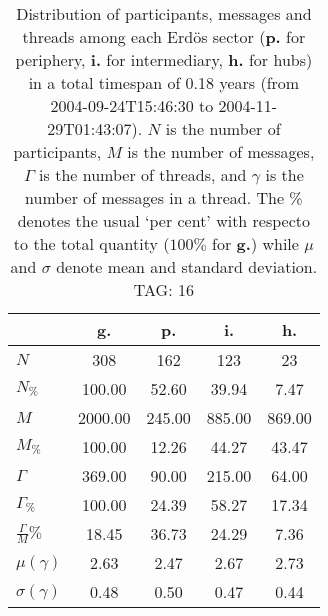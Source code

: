 \begin{table}[h!]
\begin{center}
\begin{tabular}{| l || c | c | c | c |}\hline
 & {\bf g.} & {\bf p.} & {\bf i.} & {\bf h.} \\\hline\hline
$N$ & 308  & 162  & 123  & 23 \\
$N_{\%}$ & 100.00  & 52.60  & 39.94  & 7.47 \\\hline
$M$ & 2000.00  & 245.00  & 885.00  & 869.00 \\
$M_{\%}$ & 100.00  & 12.26  & 44.27  & 43.47 \\\hline
$\Gamma$ & 369.00  & 90.00  & 215.00  & 64.00 \\
$\Gamma_{\%}$ & 100.00  & 24.39  & 58.27  & 17.34 \\\hline
$\frac{\Gamma}{M}\%$ & 18.45  & 36.73  & 24.29  & 7.36 \\
$\mu(\gamma)$ & 2.63  & 2.47  & 2.67  & 2.73 \\
$\sigma(\gamma)$ & 0.48  & 0.50  & 0.47  & 0.44 \\\hline
\end{tabular}
\caption{Distribution of participants, messages and threads among each Erd\"os sector ({\bf p.} for periphery, {\bf i.} for intermediary, 
    {\bf h.} for hubs) in a total timespan of 0.18 years (from 2004-09-24T15:46:30 to 2004-11-29T01:43:07). $N$ is the number of participants, $M$ is the number of messages, $\Gamma$ is the number of threads, and $\gamma$ is the number of messages in a thread.
    The \% denotes the usual `per cent' with respecto to the total quantity ($100\%$ for {\bf g.})
    while $\mu$ and $\sigma$ denote mean and standard deviation. TAG: 16}
\end{center}
\end{table}